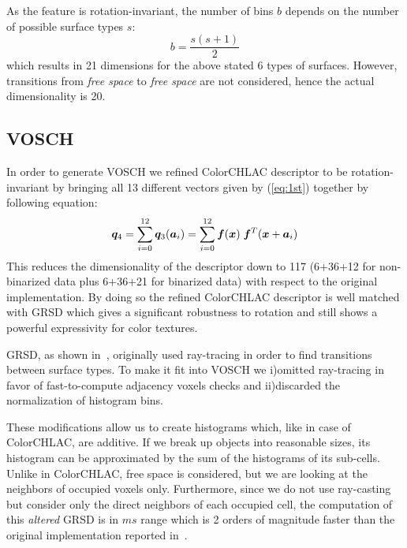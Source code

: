\documentclass[conference]{sty/IEEEtran}
\begin{document}
As the feature is rotation-invariant, the number of bins $b$ depends on the number of possible 
surface types $s$:
\begin{equation}
b=\frac{s(s+1)}{2}
\end{equation}
which results in 21 dimensions for the above stated 6 types of surfaces. However,
transitions from \emph{free space} to \emph{free space} are not considered, hence
the actual dimensionality is 20.

\subsection{VOSCH}
\label{sec:VOSCH}
In order to generate VOSCH we refined ColorCHLAC descriptor to be rotation-invariant by bringing all  
13 different vectors given by (\ref{eq:1st}) together by following equation: 
\begin{equation}\label{eq:1st_new}
  {\bm q_4} = \sum_{i=0}^{12} {\bm q_3}({\bm a}_i) = \sum_{i=0}^{12} \bm{f}({\bm x}) \hspace{1mm}\bm{f}^T({\bm x}+{\bm a_i}) \\
\end{equation}
%
This reduces the dimensionality of the descriptor down to 117 (6+36+12 for non-binarized data plus 6+36+21 
for binarized data) with respect to the original implementation. 
By doing so the refined ColorCHLAC descriptor is well matched with GRSD which gives a significant 
robustness to rotation and still shows a powerful expressivity for color textures.

GRSD, as shown in~\cite{GRSD10Humanoids}, originally used
ray-tracing in order to find transitions between surface types. To make it fit into VOSCH 
we i)omitted ray-tracing in favor of fast-to-compute adjacency voxels checks and ii)discarded
the normalization of histogram bins.

These modifications allow us to create histograms which, like in case of ColorCHLAC, are additive.
If we break up objects into reasonable sizes, its histogram can be approximated by the sum of the
histograms of its sub-cells. Unlike in ColorCHLAC, free space is considered, but we are looking
at the neighbors of occupied voxels only. Furthermore, since we do not use ray-casting but 
consider only the direct neighbors of each occupied cell, the computation of this \emph{altered} GRSD is in 
$ms$ range which is 2 orders of magnitude faster than the original implementation
reported in~\cite{GRSD10Humanoids}.
\end{document}
